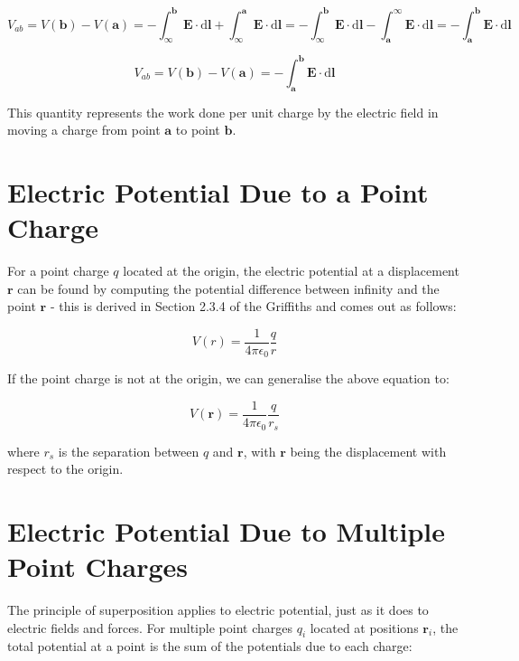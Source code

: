 \documentclass[
  letterpaper,
  DIV=11,
  numbers=noendperiod]{scrreprt}
\begin{document}
\[ V_{ab} = V(\mathrm{\mathbf{b}}) − V(\mathrm{\mathbf{a}}) = -\int_{\infty}^{\mathrm{\mathbf{b}}} \mathrm{\mathbf{E}}\cdot \mathrm{d} \mathrm{\mathbf{l}}+ \int_{\infty}^{\mathrm{\mathbf{a}}} \mathrm{\mathbf{E}}\cdot \mathrm{d} \mathrm{\mathbf{l}}= -\int_{\infty}^{\mathrm{\mathbf{b}}} \mathrm{\mathbf{E}}\cdot \mathrm{d} \mathrm{\mathbf{l}}- \int_{\mathrm{\mathbf{a}}}^{\infty} \mathrm{\mathbf{E}}\cdot \mathrm{d} \mathrm{\mathbf{l}}=  -\int_{\mathrm{\mathbf{a}}}^{\mathrm{\mathbf{b}}} \mathrm{\mathbf{E}}\cdot \mathrm{d} \mathrm{\mathbf{l}}\]

\[ V_{ab} = V(\mathrm{\mathbf{b}}) − V(\mathrm{\mathbf{a}}) = -\int_{\mathrm{\mathbf{a}}}^{\mathrm{\mathbf{b}}} \mathrm{\mathbf{E}}\cdot \mathrm{d} \mathrm{\mathbf{l}}\]

This quantity represents the work done per unit charge by the electric
field in moving a charge from point \(\mathrm{\mathbf{a}}\) to point
\(\mathrm{\mathbf{b}}\).

\section{Electric Potential Due to a Point
Charge}\label{electric-potential-due-to-a-point-charge}

For a point charge \(q\) located at the origin, the electric potential
at a displacement \(\mathrm{\mathbf{r}}\) can be found by computing the
potential difference between infinity and the point
\(\mathrm{\mathbf{r}}\) - this is derived in Section 2.3.4 of the
Griffiths and comes out as follows:

\[ V(r) = \frac{1}{4\pi\epsilon_0} \frac{q}{r} \]

If the point charge is not at the origin, we can generalise the above
equation to:

\[ V(\mathrm{\mathbf{r}}) = \frac{1}{4\pi\epsilon_0} \frac{q}{r_s} \]

where \(r_s\) is the separation between \(q\) and
\(\mathrm{\mathbf{r}}\), with \(\mathrm{\mathbf{r}}\) being the
displacement with respect to the origin.

\section{Electric Potential Due to Multiple Point
Charges}\label{electric-potential-due-to-multiple-point-charges}

The principle of superposition applies to electric potential, just as it
does to electric fields and forces. For multiple point charges \(q_i\)
located at positions \(\mathrm{\mathbf{r}}_i\), the total potential at a
point is the sum of the potentials due to each
charge:
\end{document}
